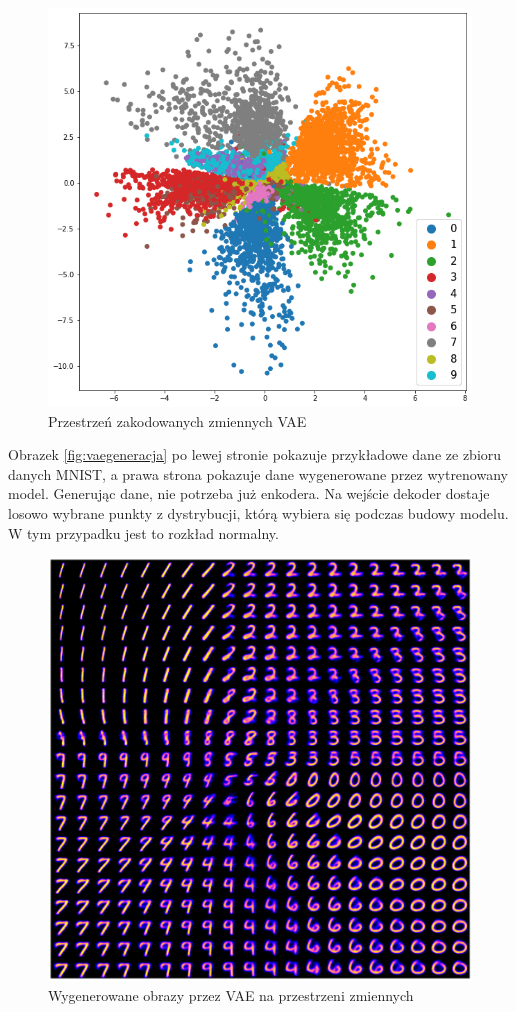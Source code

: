 \documentclass[a4paper,12pt,oneside]{book} %
\begin{document}
\begin{figure}[h!]
	\centering
	\includegraphics[width=12cm]{vaelatentspace.png}
	\caption{Przestrzeń zakodowanych zmiennych VAE}
	\label{fig:vaelatent}
\end{figure}
Obrazek \ref{fig:vaegeneracja} po lewej stronie pokazuje przykładowe dane ze zbioru danych MNIST, a prawa strona pokazuje dane wygenerowane przez wytrenowany model. Generując dane, nie potrzeba już enkodera. Na wejście dekoder dostaje losowo wybrane punkty z dystrybucji, którą wybiera się podczas budowy modelu. W tym przypadku jest to rozkład normalny.
\newpage
\begin{figure}[h!]
	\centering
	\includegraphics[width=14cm]{vaelatentgen.png}
	\caption{Wygenerowane obrazy przez VAE na przestrzeni zmiennych}
	\label{fig:vaelatentgen}
\end{figure}
\end{document}
